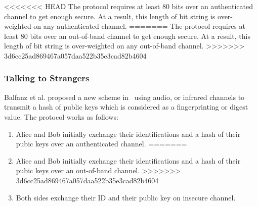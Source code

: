 <<<<<<< HEAD
The protocol requires at least 80 bits over an authenticated channel to get enough secure. At a result, this length of bit string is over-weighted on any authenticated channel. 
=======
The protocol requires at least 80 bits over an out-of-band channel to get enough secure. At a result, this length of bit string is over-weighted on any out-of-band channel. 
>>>>>>> 3d6cc25ad869467a057daa522b35e3cad82b4604
 
\subsubsection{Talking to Strangers}

Balfanz et al. proposed a new scheme in~\cite{Smetters02talkingto} using audio, or infrared channels to transmit a hash of public keys which is considered as a fingerprinting or digest value. The protocol works as follows:
\begin{enumerate}
<<<<<<< HEAD
\item Alice and Bob initially exchange their identifications and a hash of their pubic keys over an authenticated channel.
=======
\item Alice and Bob initially exchange their identifications and a hash of their pubic keys over an out-of-band channel.
>>>>>>> 3d6cc25ad869467a057daa522b35e3cad82b4604
\item Both sides exchange their ID and their public key on insecure channel. 
\end{enumerate}

\begin{center}
\end{center}

